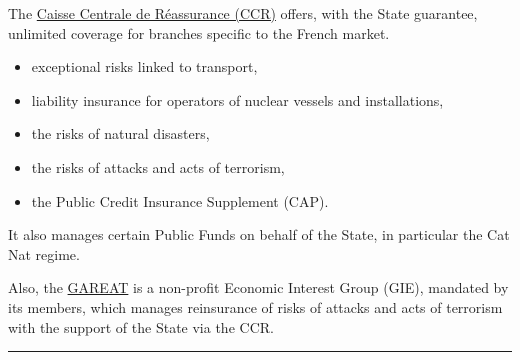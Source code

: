 \begin{f}
The \href{http://www.ccr.fr}{Caisse Centrale de Réassurance (CCR)} offers, with the State guarantee, unlimited coverage for branches specific to the French market.
\begin{itemize}
\item   exceptional risks linked to transport,
\item   liability insurance for operators of nuclear vessels and installations,
\item   the risks of natural disasters,
\item   the risks of attacks and acts of terrorism,
\item   the Public Credit Insurance Supplement (CAP).
\end{itemize}
It also manages certain Public Funds on behalf of the State, in particular the Cat Nat regime.

Also, the \href{http://www.gareat.com/}{GAREAT} is a non-profit Economic Interest Group (GIE), mandated by its members, which manages reinsurance of risks of attacks and acts of terrorism with the support of the State via the CCR.
\end{f}
\hrule

